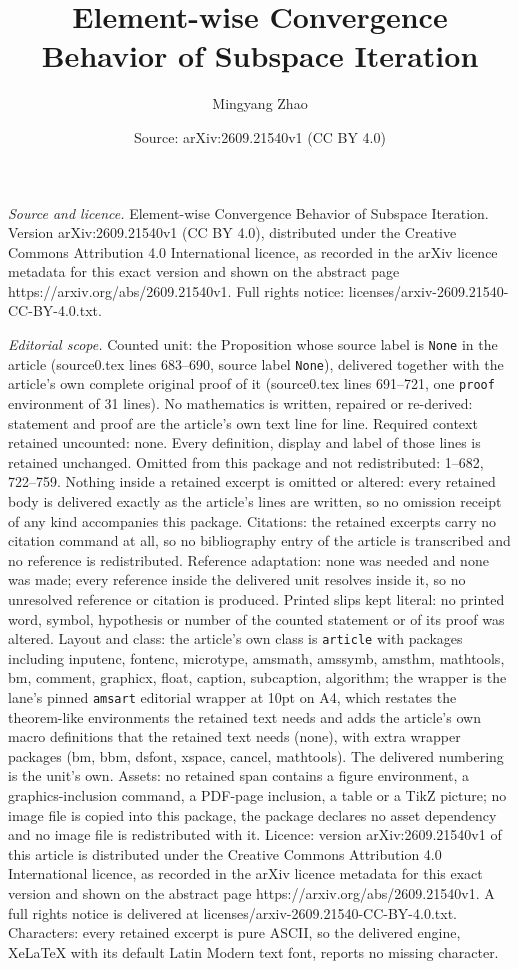 \documentclass[10pt,a4paper]{amsart}
\title[Element-wise Convergence Behavior of Subspace Iteration]{Element-wise Convergence Behavior of Subspace Iteration}
\author{Mingyang Zhao}
\date{Source: arXiv:2609.21540v1 (CC BY 4.0)}
\begin{document}
\maketitle

\noindent\emph{Source and licence.} Element-wise Convergence Behavior of Subspace Iteration. Version arXiv:2609.21540v1 (CC BY 4.0), distributed under the Creative Commons Attribution 4.0 International licence, as recorded in the arXiv licence metadata for this exact version and shown on the abstract page https://arxiv.org/abs/2609.21540v1. Full rights notice: licenses/arxiv-2609.21540-CC-BY-4.0.txt.\par\smallskip

\noindent\textit{Editorial scope.} Counted unit: the Proposition whose source label is \texttt{None} in the article (source0.tex lines 683--690, source label \texttt{None}), delivered together with the article's own complete original proof of it (source0.tex lines 691--721, one \texttt{proof} environment of 31 lines). No mathematics is written, repaired or re-derived: statement and proof are the article's own text line for line. Required context retained uncounted: none. Every definition, display and label of those lines is retained unchanged. Omitted from this package and not redistributed: 1--682, 722--759. Nothing inside a retained excerpt is omitted or altered: every retained body is delivered exactly as the article's lines are written, so no omission receipt of any kind accompanies this package. Citations: the retained excerpts carry no citation command at all, so no bibliography entry of the article is transcribed and no reference is redistributed. Reference adaptation: none was needed and none was made; every reference inside the delivered unit resolves inside it, so no unresolved reference or citation is produced. Printed slips kept literal: no printed word, symbol, hypothesis or number of the counted statement or of its proof was altered. Layout and class: the article's own class is \texttt{article} with packages including inputenc, fontenc, microtype, amsmath, amssymb, amsthm, mathtools, bm, comment, graphicx, float, caption, subcaption, algorithm; the wrapper is the lane's pinned \texttt{amsart} editorial wrapper at 10pt on A4, which restates the theorem-like environments the retained text needs and adds the article's own macro definitions that the retained text needs (none), with extra wrapper packages (bm, bbm, dsfont, xspace, cancel, mathtools). The delivered numbering is the unit's own. Assets: no retained span contains a figure environment, a graphics-inclusion command, a PDF-page inclusion, a table or a TikZ picture; no image file is copied into this package, the package declares no asset dependency and no image file is redistributed with it. Licence: version arXiv:2609.21540v1 of this article is distributed under the Creative Commons Attribution 4.0 International licence, as recorded in the arXiv licence metadata for this exact version and shown on the abstract page https://arxiv.org/abs/2609.21540v1. A full rights notice is delivered at licenses/arxiv-2609.21540-CC-BY-4.0.txt. Characters: every retained excerpt is pure ASCII, so the delivered engine, XeLaTeX with its default Latin Modern text font, reports no missing character.
\end{document}
